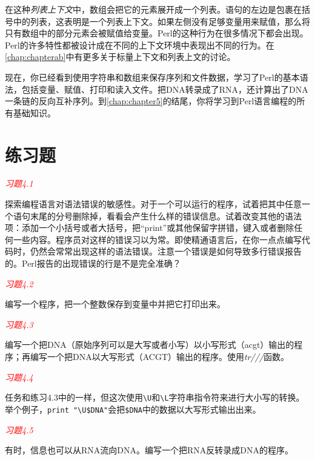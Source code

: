 在这种\textit{列表上下文}中，数组会把它的元素展开成一个列表。语句的左边是包裹在括号中的列表，这表明是一个列表上下文。如果左侧没有足够变量用来赋值，那么将只有数组中的部分元素会被赋值给变量。Perl的这种行为在很多情况下都会出现。Perl的许多特性都被设计成在不同的上下文环境中表现出不同的行为。在\autoref{chap:chapterab}中有更多关于标量上下文和列表上文的讨论。

现在，你已经看到使用字符串和数组来保存序列和文件数据，学习了Perl的基本语法，包括变量、赋值、打印和读入文件。把DNA转录成了RNA，还计算出了DNA一条链的反向互补序列。到\autoref{chap:chapter5}的结尾，你将学习到Perl语言编程的所有基础知识。

\section{练习题}
\textcolor{red}{\textit{习题4.1}}
\begin{adjustwidth}{4em}{}
探索编程语言对语法错误的敏感性。对于一个可以运行的程序，试着把其中任意一个语句末尾的分号删除掉，看看会产生什么样的错误信息。试着改变其他的语法项：添加一个小括号或者大括号，把“print”或其他保留字拼错，键入或者删除任何一些内容。程序员对这样的错误习以为常。即使精通语言后，在你一点点编写代码时，仍然会常常出现这样的语法错误。注意一个错误是如何导致多行错误报告的。Perl报告的出现错误的行是不是完全准确？
\end{adjustwidth}

\textcolor{red}{\textit{习题4.2}}
\begin{adjustwidth}{4em}{}
编写一个程序，把一个整数保存到变量中并把它打印出来。
\end{adjustwidth}

\textcolor{red}{\textit{习题4.3}}
\begin{adjustwidth}{4em}{}
编写一个把DNA（原始序列可以是大写或者小写）以小写形式（acgt）输出的程序；再编写一个把DNA以大写形式（ACGT）输出的程序。使用\textit{tr///}函数。
\end{adjustwidth}

\textcolor{red}{\textit{习题4.4}}
\begin{adjustwidth}{4em}{}
任务和练习4.3中的一样，但这次使用\verb|\U|和\verb|\L|字符串指令符来进行大小写的转换。举个例子，\verb|print "\U$DNA"|会把\verb|$DNA|中的数据以大写形式输出出来。
\end{adjustwidth}

\textcolor{red}{\textit{习题4.5}}
\begin{adjustwidth}{4em}{}
有时，信息也可以从RNA流向DNA。编写一个把RNA反转录成DNA的程序。
\end{adjustwidth}

